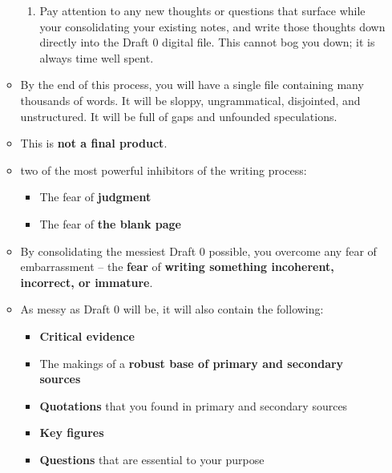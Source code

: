 \documentclass[11pt]{article}
\begin{document}
\begin{itemize}
\begin{exercise}
\begin{itemize}
\begin{enumerate}
\item Pay attention to any new thoughts or questions that surface while your consolidating your existing notes, and write those thoughts down directly into the Draft 0 digital file. This cannot bog you down; it is always time well spent.
\end{enumerate}

\item By the end of this process, you will have a single file containing many thousands of words. It will be sloppy, ungrammatical, disjointed, and unstructured. It will be full of gaps and unfounded speculations.

\item This is \textbf{not a final product}.

\item  two of the most powerful inhibitors of the writing process:
\begin{itemize}
\item The fear of \textbf{judgment}
\item The fear of \textbf{the blank page}
\end{itemize}

\item By consolidating the messiest Draft 0 possible, you overcome any fear of embarrassment -- the \textbf{fear} of \textbf{writing something incoherent, incorrect, or immature}. 

\item As messy as Draft 0 will be, it will also contain the following:
\begin{itemize}
\item \textbf{Critical evidence}
\item The makings of a \textbf{robust base of primary and secondary sources}
\item \textbf{Quotations} that you found in primary and secondary sources
\item \textbf{Key figures}
\item \textbf{Questions} that are essential to your purpose 
\end{itemize}
\end{itemize}
\end{exercise}
\end{itemize}
\end{document}
